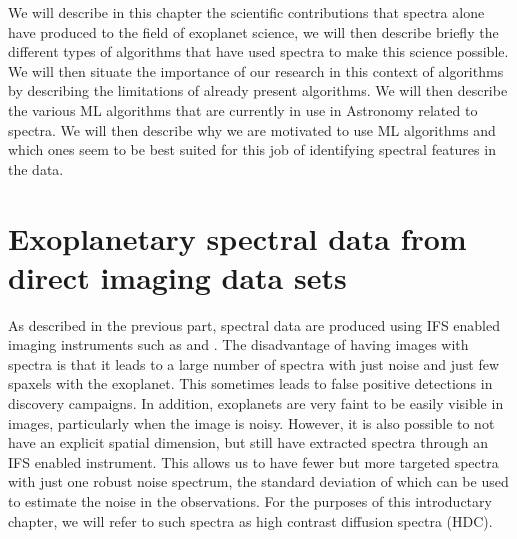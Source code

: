 We will describe in this chapter the scientific contributions that spectra alone have produced to the field of exoplanet science, we will then describe briefly the different types of algorithms that have used spectra to make this science possible. 
We will then situate the importance of our research in this context of algorithms by describing the limitations of already present algorithms. 
We will then describe the various ML algorithms that are currently in use in Astronomy related to spectra.
We will then describe why we are motivated to use ML algorithms and which ones seem to be best suited for this job of identifying spectral features in the data.
\section{Exoplanetary spectral data from direct imaging data sets}
As described in the previous part, spectral data are produced using IFS enabled imaging instruments such as \citep[SINFONI, ][]{2004SINFONI} and \citep[GPI, ][]{2014MacintoshGPI}.
The disadvantage of having images with spectra is that it leads to a large number of spectra with just noise and just few spaxels with the exoplanet.
This sometimes leads to false positive detections in discovery campaigns.
In addition, exoplanets are very faint to be easily visible in images, particularly when the image is noisy.
However, it is also possible to not have an explicit spatial dimension, but still have extracted spectra through an IFS enabled instrument.
This allows us to have fewer but more targeted spectra with just one robust noise spectrum, the standard deviation of which can be used to estimate the noise in the observations.
For the purposes of this introductary chapter, we will  refer to such spectra as high contrast diffusion spectra (HDC).

